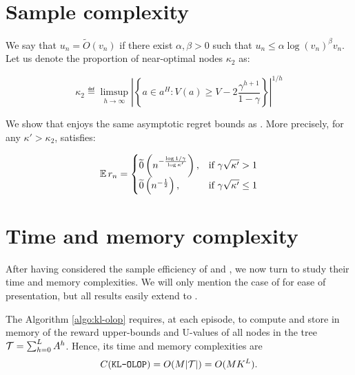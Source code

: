 \documentclass[runningheads]{llncs}
\begin{document}
\section{Sample complexity}
\label{sec:sample-complexity}

We say that $u_n = \tilde{O}(v_n)$ if there exist $\alpha, \beta >0$ such that $u_n \leq \alpha \log(v_n)^\beta v_n$.
Let us denote the proportion of near-optimal nodes $\kappa_2$ as:


\begin{equation*}
    \label{eq:kappa}
    \kappa_2 \eqdef \limsup_{h\rightarrow\infty}{\left|\left\{a\in a^H:V(a) \geq V - 2\frac{\gamma^{h+1}}{1-\gamma}\right\}\right|^{1/h}}
\end{equation*}

\begin{theorem}
\label{thm:regret}
We show that \KLOLOP enjoys the same asymptotic regret bounds as \OLOP. More precisely, for any $\kappa' > \kappa_2$, \KLOLOP satisfies:


\begin{equation*}
    \expectedvalue r_n = \begin{cases}
      \tilde{0}\left(n^{-\frac{\log 1/\gamma}{\log \kappa'}}\right), & \text{if}\ \gamma\sqrt{\kappa'} > 1 \\
      \tilde{0}\left(n^{-\frac{1}{2}}\right), & \text{if}\ \gamma\sqrt{\kappa'} \leq 1
    \end{cases}
\end{equation*}
\end{theorem}

\section{Time and memory complexity}
\label{sec:time-complexity}

After having considered the sample efficiency of \OLOP and \KLOLOP, we now turn to study their time and memory complexities. We will only mention the case of \KLOLOP for ease of presentation, but all results easily extend to \OLOP.

The Algorithm \ref{algo:kl-olop} requires, at each episode, to compute and store in memory of the reward upper-bounds and U-values of all nodes in the tree $\mathcal{T} = \sum_{h=0}^L A^h$.
Hence, its time and memory complexities are 
\begin{equation}
    C(\texttt{KL-OLOP}) = O(M|\mathcal{T}|) = O(MK^L).
\end{equation}
\end{document}
